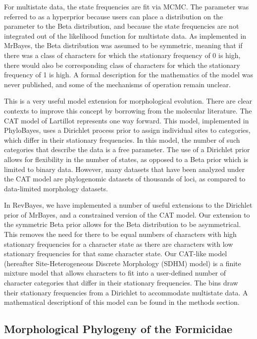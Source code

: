 \documentclass[]{article}
\begin{document}
For multistate data, the state frequencies are fit via MCMC.
The parameter was referred to as a hyperprior because users can place a distribution on the parameter to the Beta distribution, and because the state frequencies are not integrated out of the likelihood function for multistate data. 
As implemented in MrBayes, the Beta distribution was assumed to be symmetric, meaning that if there was a class of characters for which the stationary frequency of 0 is high, there would also be corresponding class of characters for which the stationary frequency of 1 is high.
A formal description for the mathematics of the model was never published, and some of the mechanisms of operation remain unclear. 
\par
This is a very useful model extension for morphological evolution.
There are clear contexts to improve this concept by borrowing from the molecular literature.
The CAT model of Lartillot represents one way forward. 
This model, implemented in PhyloBayes, uses a Dirichlet process prior to assign individual sites to categories, which differ in their stationary frequencies. 
In this model, the number of such categories that describe the data is a free parameter. 
The use of a Dirichlet prior allows for flexibility in the number of states, as opposed to a Beta prior which is limited to binary data.
However, many datasets that have been analyzed under the CAT model are phylogenomic datasets of thousands of loci, as compared to data-limited morphology datasets.\par
In RevBayes, we have implemented a number of useful extensions to the Dirichlet prior of MrBayes, and a constrained version of the CAT model. 
Our extension to the symmetric Beta prior allows for the Beta distribution to be asymmetrical.
This removes the need for there to be equal numbers of characters with high stationary frequencies for a character state as there are characters with low stationary frequencies for that same character state.
Our CAT-like model (hereafter Site-Heterogeneous Discrete Morphology (SDHM) model) is a finite mixture model that allows characters to fit into a user-defined number of character categories that differ in their stationary frequencies. 
The bins draw their stationary frequencies from a Dirichlet to accommodate multistate data. 
A mathematical descriptionf of this model can be found in the methods section. \par

\subsection{Morphological Phylogeny of the Formicidae}
\end{document}
